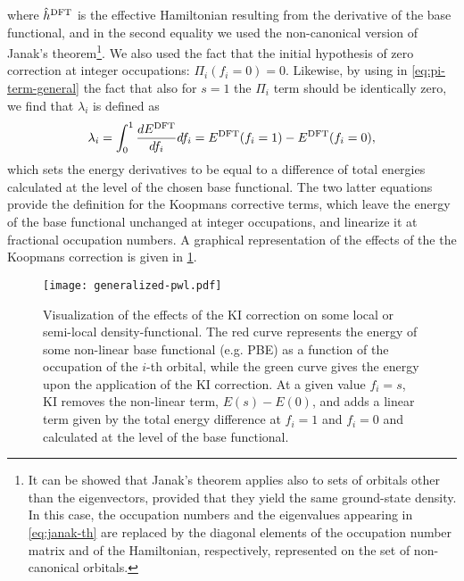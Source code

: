 %
where $\hat{h}^{\rm DFT}$ is the effective Hamiltonian resulting from the derivative of the base functional, and in the second equality we used the non-canonical version of Janak's theorem\footnote{It can be showed that Janak's theorem applies also to sets of orbitals other than the eigenvectors, provided that they yield the same ground-state density. In this case, the occupation numbers and the eigenvalues appearing in \cref{eq:janak-th} are replaced by the diagonal elements of the occupation number matrix and of the Hamiltonian, respectively, represented on the set of non-canonical orbitals.}. We also used the fact that the initial hypothesis of zero correction at integer occupations: $\Pi_i(f_i=0) = 0$. Likewise, by using in \cref{eq:pi-term-general} the fact that also for $s=1$ the $\Pi_i$ term should be identically zero, we find that $\lambda_i$ is defined as
%
\begin{equation}
    \lambda_i = \int_0^{1} \frac{dE^{\rm DFT}}{df_i} df_i = E^{\rm DFT}(f_i=1) - E^{\rm DFT}(f_i=0) ,
    \label{eq:lambda-definition}
\end{equation}
%
which sets the energy derivatives to be equal to a difference of total energies calculated at the level of the chosen base functional. The two latter equations provide the definition for the Koopmans corrective terms, which leave the energy of the base functional unchanged at integer occupations, and linearize it at fractional occupation numbers. A graphical representation of the effects of the the Koopmans correction is given in \cref{fig:kc-correction-visual}.

\begin{figure}
    \centering
    \texttt{[image: generalized-pwl.pdf]}
    \caption[Graphical representation of the KI correction.]{Visualization of the effects of the KI correction on some local or semi-local density-functional. The red curve represents the energy of some non-linear base functional (e.g. PBE) as a function of the occupation of the $i$-th orbital, while the green curve gives the energy upon the application of the KI correction. At a given value $f_i=s$, KI removes the non-linear term, $E(s)-E(0)$, and adds a linear term given by the total energy difference at $f_i=1$ and $f_i=0$ and calculated at the level of the base functional.}
    \label{fig:kc-correction-visual}
\end{figure}

